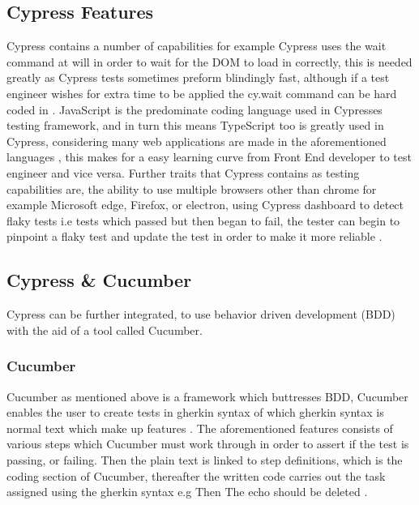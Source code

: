 \subsection{Cypress Features}
Cypress contains a number of capabilities for example Cypress uses the wait command at will in order to wait for the DOM to load in correctly, this is needed greatly as Cypress tests sometimes preform blindingly fast, although if a test engineer wishes for extra time to be applied the cy.wait command can be hard coded in \cite{SwitchCy}. JavaScript is the predominate coding language used in Cypresses testing framework, and in turn this means TypeScript too is greatly used in Cypress, considering many web applications are made in the aforementioned languages \cite{MostUsedLang}, this makes for a easy learning curve from Front End developer to test engineer and vice versa. Further traits that Cypress contains as testing capabilities are, the ability to use multiple browsers other than chrome for example Microsoft edge, Firefox, or electron, using Cypress dashboard to detect flaky tests i.e tests which passed but then began to fail, the tester can begin to pinpoint a flaky test and update the test in order to make it more reliable \cite{WhyCypress}.

\subsection{Cypress \& Cucumber}\label{sec:cypress-cucumber}
Cypress can be further integrated, to use behavior driven development (BDD) with the aid of a tool called Cucumber.

\subsubsection{Cucumber}
Cucumber as mentioned above is a framework which buttresses BDD, Cucumber enables the user to create tests in gherkin syntax of which gherkin syntax is normal text which make up features \cite{pelivani2022comparative}. The aforementioned features consists of various steps which Cucumber must work through in order to assert if the test is passing, or failing. Then the plain text is linked to step definitions, which is the coding section of Cucumber, thereafter the written code carries out the task assigned using the gherkin syntax e.g Then The echo should be deleted \cite{Cucumber}.


